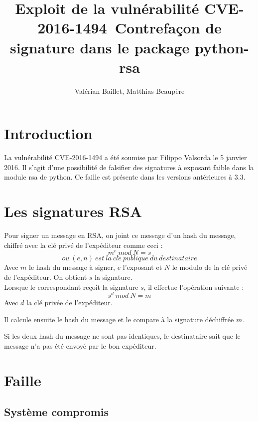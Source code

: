\documentclass[a4,12pt]{article}
\begin{document}
\begin{titlepage}
  \title{Exploit de la vulnérabilité CVE-2016-1494\
    Contrefaçon de signature dans le package python-rsa
  }
  \author{Valérian Baillet, Matthias Beaupère}
  \date{}
\end{titlepage}

\maketitle

\section{Introduction}

La vulnérabilité CVE-2016-1494 a été soumise par Filippo Valsorda le 5 janvier 2016. Il s'agit d'une possibilité de falsifier des signatures à exposant faible dans la module rsa de python. Ce faille est présente dans les versions antérieures à 3.3.

\section{Les signatures RSA}\label{section_2}

Pour signer un message en RSA, on joint ce message d'un hash du message, chiffré avec la clé privé de l'expéditeur comme ceci :
$$
m^e\ mod\ N = s $$
$$
ou\ (e,n)\ est\ la\ cl\acute{e} \ publique\ du\ destinataire
$$
Avec $m$ le hash du message à signer, $e$ l'exposant et $N$ le modulo de la clé privé de l'expéditeur. On obtient $s$ la signature.\\

Lorsque le correspondant reçoit la signature $s$, il effectue l'opération suivante :
$$
s^d\ mod\ N = m
$$
Avec $d$ la clé privée de l'expéditeur.

Il calcule ensuite le hash du message et le compare à la signature déchiffrée $m$.

Si les deux hash du message ne sont pas identiques, le destinataire sait que le message n'a pas été envoyé par le bon expéditeur.

\section{Faille}
\subsection{Système compromis}
\end{document}
